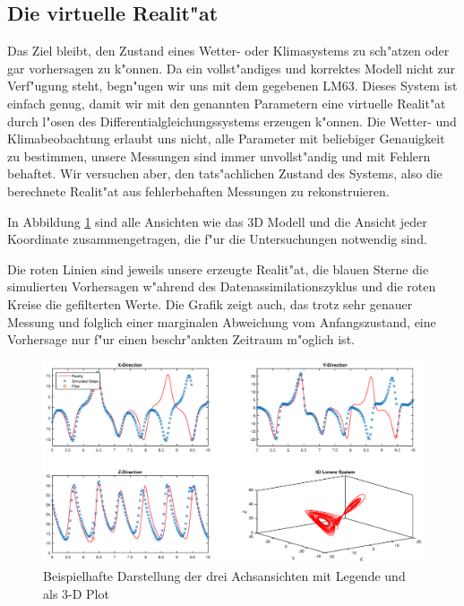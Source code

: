 \begin{refsection}
\subsection{Die virtuelle Realit"at}
Das Ziel bleibt, den Zustand eines Wetter- oder Klimasystems zu sch"atzen oder gar vorhersagen zu k"onnen. Da ein vollst"andiges und korrektes Modell nicht zur Verf"ugung steht, begn"ugen wir uns mit dem gegebenen LM63. Dieses System ist einfach genug, damit wir mit den genannten Parametern eine virtuelle Realit"at durch l"osen des Differentialgleichungssystems erzeugen k"onnen. Die Wetter- und Klimabeobachtung erlaubt uns nicht, alle Parameter mit beliebiger Genauigkeit zu bestimmen, unsere Messungen sind immer unvollst"andig und mit Fehlern behaftet. Wir versuchen aber, den tats"achlichen Zustand des Systems, also die berechnete Realit"at aus fehlerbehaften Messungen zu rekonstruieren.

In Abbildung \ref{kalman:Oberfl} sind alle Ansichten wie das 3D Modell und die Ansicht jeder Koordinate zusammengetragen, die f"ur die Untersuchungen notwendig sind.

Die roten Linien sind jeweils unsere erzeugte Realit"at, die blauen Sterne die simulierten Vorhersagen w"ahrend des Datenassimilationszyklus und die roten Kreise die gefilterten Werte. Die Grafik zeigt auch, das trotz sehr genauer Messung und folglich einer marginalen Abweichung vom Anfangszustand, eine Vorhersage nur f"ur einen beschr"ankten Zeitraum m"oglich ist. 

\begin{figure}
\centering
\includegraphics[width=\hsize]{kalman/figures/3dsystemview.eps}
\caption{Beispielhafte Darstellung der drei Achsansichten mit Legende und als 3-D Plot}
\label{kalman:Oberfl}
\end{figure}


\end{refsection}
